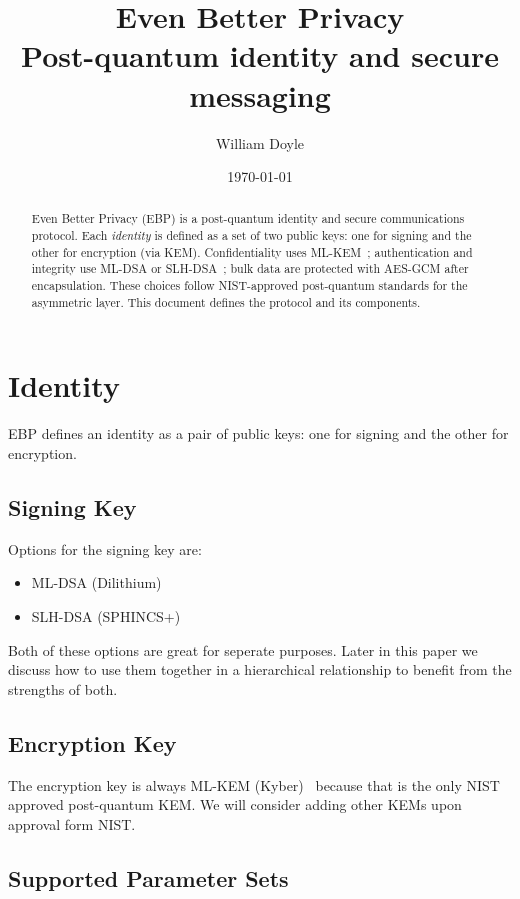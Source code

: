 \documentclass[11pt,a4paper]{article}
\title{%
  {\Huge Even Better Privacy}\\[1ex]%
  {\large Post-quantum identity and secure messaging}%
}
\author{William Doyle}
\date{\today}
\begin{document}
\maketitle

\begin{abstract}
Even Better Privacy (EBP) is a post-quantum identity and secure communications protocol.
Each \emph{identity} is defined as a set of two public keys: one for signing and the other for encryption (via KEM).
Confidentiality uses ML-KEM~\cite{fips203}; authentication and integrity use ML-DSA or SLH-DSA~\cite{fips204,fips205}; bulk data are protected with AES-GCM after encapsulation.
These choices follow NIST-approved post-quantum standards for the asymmetric layer.
This document defines the protocol and its components.
\end{abstract}

\section{Identity}

EBP defines an identity as a pair of public keys: one for signing and the other for encryption.

\subsection{Signing Key}

Options for the signing key are:
\begin{itemize}
  \item ML-DSA (Dilithium)~\cite{fips204}
  \item SLH-DSA (SPHINCS+)~\cite{fips205}
\end{itemize}

Both of these options are great for seperate purposes. Later in this paper we discuss how to use them together in a hierarchical relationship to benefit from the strengths of both.


\subsection{Encryption Key}

The encryption key is always ML-KEM (Kyber)~\cite{fips203} because that is the only NIST approved post-quantum KEM. We will consider adding other KEMs upon approval form NIST. 

\subsection{Supported Parameter Sets}
\end{document}
